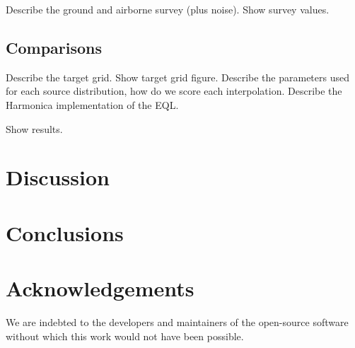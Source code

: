 \documentclass[twocolumn]{article}
\begin{document}
Describe the ground and airborne survey (plus noise).
Show survey values.

\subsection{Comparisons}

Describe the target grid. Show target grid figure.
Describe the parameters used for each source distribution, how do we score each interpolation.
Describe the Harmonica implementation of the EQL.

Show results.


\section{Discussion}


\section{Conclusions}


\section{Acknowledgements}

We are indebted to the developers and maintainers of the open-source software without
which this work would not have been possible.




\end{document}
